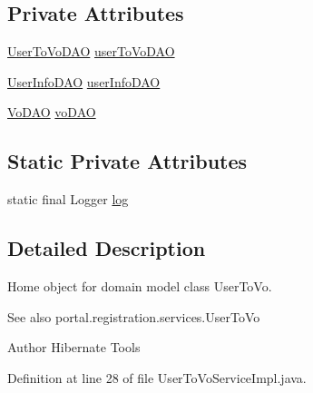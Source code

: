 \subsection*{Private Attributes}
\begin{DoxyCompactItemize}
\item 
\hyperlink{interfaceportal_1_1registration_1_1dao_1_1UserToVoDAO}{UserToVoDAO} \hyperlink{classportal_1_1registration_1_1services_1_1UserToVoServiceImpl_a2601e092ad2cd9e5ace07ec16db395bd}{userToVoDAO}
\item 
\hyperlink{interfaceportal_1_1registration_1_1dao_1_1UserInfoDAO}{UserInfoDAO} \hyperlink{classportal_1_1registration_1_1services_1_1UserToVoServiceImpl_a4009afa6dfdcd91350d08ccf127eb334}{userInfoDAO}
\item 
\hyperlink{interfaceportal_1_1registration_1_1dao_1_1VoDAO}{VoDAO} \hyperlink{classportal_1_1registration_1_1services_1_1UserToVoServiceImpl_a0eb772d6b45bde5ccc9b55dc1638eafa}{voDAO}
\end{DoxyCompactItemize}
\subsection*{Static Private Attributes}
\begin{DoxyCompactItemize}
\item 
static final Logger \hyperlink{classportal_1_1registration_1_1services_1_1UserToVoServiceImpl_aedf6cd2507a03895aa381ef754e906a5}{log}
\end{DoxyCompactItemize}


\subsection{Detailed Description}
Home object for domain model class UserToVo.

\begin{DoxySeeAlso}{See also}
portal.registration.services.UserToVo 
\end{DoxySeeAlso}
\begin{DoxyAuthor}{Author}
Hibernate Tools 
\end{DoxyAuthor}


Definition at line 28 of file UserToVoServiceImpl.java.



